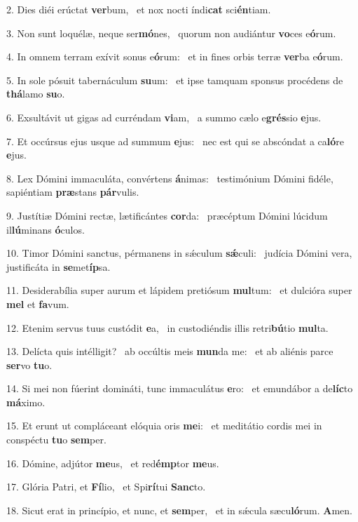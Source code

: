2. Dies diéi erúctat \textbf{ver}bum, \ast\  et nox nocti índi\textbf{cat} sci\textbf{én}tiam.\

3. Non sunt loquélæ, neque ser\textbf{mó}nes, \ast\  quorum non audiántur \textbf{vo}ces e\textbf{ó}rum.\

4. In omnem terram exívit sonus e\textbf{ó}rum: \ast\  et in fines orbis terræ \textbf{ver}ba e\textbf{ó}rum.\

5. In sole pósuit tabernáculum \textbf{su}um: \ast\  et ipse tamquam sponsus procédens de \textbf{thá}lamo \textbf{su}o.\

6. Exsultávit ut gigas ad curréndam \textbf{vi}am, \ast\  a summo cælo e\textbf{grés}sio \textbf{e}jus.\

7. Et occúrsus ejus usque ad summum \textbf{e}jus: \ast\  nec est qui se abscóndat a ca\textbf{ló}re \textbf{e}jus.\

8. Lex Dómini immaculáta, convértens \textbf{á}nimas: \ast\  testimónium Dómini fidéle, sapiéntiam \textbf{præ}stans \textbf{pár}vulis.\

9. Justítiæ Dómini rectæ, lætificántes \textbf{cor}da: \ast\  præcéptum Dómini lúcidum il\textbf{lú}minans \textbf{ó}culos.\

10. Timor Dómini sanctus, pérmanens in sǽculum \textbf{sǽ}culi: \ast\  judícia Dómini vera, justificáta in \textbf{se}met\textbf{íp}sa.\

11. Desiderabília super aurum et lápidem pretiósum \textbf{mul}tum: \ast\  et dulcióra super \textbf{mel} et \textbf{fa}vum.\

12. Etenim servus tuus custódit \textbf{e}a, \ast\  in custodiéndis illis retri\textbf{bú}tio \textbf{mul}ta.\

13. Delícta quis intélligit? \dag\  ab occúltis meis \textbf{mun}da me: \ast\  et ab aliénis parce \textbf{ser}vo \textbf{tu}o.\

14. Si mei non fúerint domináti, tunc immaculátus \textbf{e}ro: \ast\  et emundábor a de\textbf{líc}to \textbf{má}ximo.\

15. Et erunt ut compláceant elóquia oris \textbf{me}i: \ast\  et meditátio cordis mei in conspéctu \textbf{tu}o \textbf{sem}per.\

16. Dómine, adjútor \textbf{me}us, \ast\  et red\textbf{émp}tor \textbf{me}us.\

17. Glória Patri, et \textbf{Fí}lio, \ast\  et Spi\textbf{rí}tui \textbf{Sanc}to.\

18. Sicut erat in princípio, et nunc, et \textbf{sem}per, \ast\  et in sǽcula sæcu\textbf{ló}rum. \textbf{A}men.\

